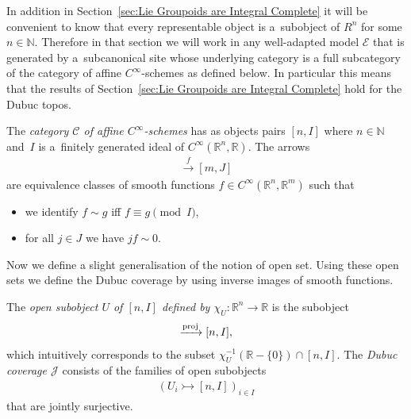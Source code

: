 \documentclass[10pt,a4paper]{amsart}
\numberwithin{equation}{section}
\begin{document}
In addition in Section~\ref{sec:Lie Groupoids are Integral Complete} it will be convenient to know that every representable object is a~subobject of $R^n$ for some $n\in \mathbb{N}$. Therefore in that section we will work in any well-adapted model $\mathcal{E}$ that is generated by a~subcanonical site whose underlying category is a full subcategory of the category of af\/f\/ine $C^{\infty}$-schemes as def\/ined below. In particular this means that the results of Section~\ref{sec:Lie Groupoids are Integral Complete} hold for the Dubuc topos.
\begin{Definition}\label{def:smooth-affine-schemes}The \emph{category $\mathcal{C}$ of affine $C^{\infty}$-schemes} has as objects pairs $[n,I]$ where $n\in\mathbb{N}$ and~$I$ is a~f\/initely generated ideal of $C^{\infty}(\mathbb{R}^n,\mathbb{R})$. The arrows
\begin{gather*}[n,I]\xrightarrow{f} [m,J]\end{gather*}
are equivalence classes of smooth functions $f\in C^{\infty}(\mathbb{R}^n,\mathbb{R}^m)$ such that
 \begin{itemize}\itemsep=0pt
 \item we identify $f\sim g$ if\/f $f\equiv g \pmod I$,
 \item for all $j\in J$ we have $jf\sim 0$.
 \end{itemize}
\end{Definition}
Now we def\/ine a slight generalisation of the notion of open set. Using these open sets we def\/ine the Dubuc coverage by using inverse images of smooth functions.
\begin{Definition}The \emph{open subobject $U$ of $[n,I]$ defined by $\chi_U\colon \mathbb{R}^n \rightarrow \mathbb{R}$} is the subobject
 \begin{gather*}[n+1,(I,\chi_U\cdot X_{n+1}-1)] \xrightarrow{{\rm proj}} [n,I],\end{gather*}
which intuitively corresponds to the subset $\chi_U^{-1}(\mathbb{R}-\{0\})\cap[n,I]$. The \emph{Dubuc coverage $\mathcal{J}$} consists of the families of open subobjects
 \begin{gather*}(U_i \rightarrowtail [n,I])_{i\in I}\end{gather*}
that are jointly surjective.
\end{Definition}
\end{document}
